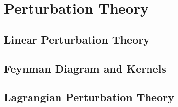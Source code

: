 \chapter{Perturbation Theory}

\section{Linear Perturbation Theory}

\section{Feynman Diagram and Kernels}

\section{Lagrangian Perturbation Theory}

